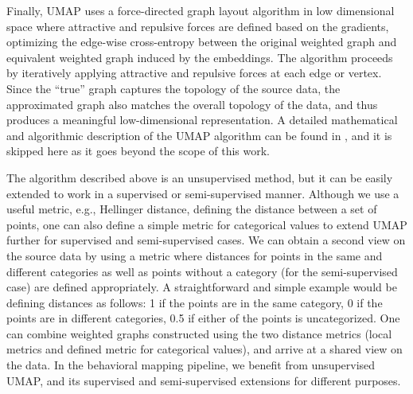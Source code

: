 Finally, UMAP uses a force-directed graph layout algorithm in low dimensional space where attractive and repulsive forces are defined based on the gradients, optimizing the edge-wise cross-entropy between the original weighted graph and equivalent weighted graph induced by the embeddings.
The algorithm proceeds by iteratively applying attractive and repulsive forces at each edge or vertex.
Since the ``true'' graph captures the topology of the source data, the approximated graph also matches the overall topology of the data, and thus produces a meaningful low-dimensional representation.
A detailed mathematical and algorithmic description of the UMAP algorithm can be found in \citep{mcinnes_umap_2020}, and it is skipped here as it goes beyond the scope of this work.

The algorithm described above is an unsupervised method, but it can be easily extended to work in a supervised or semi-supervised manner.
Although we use a useful metric, e.g., Hellinger distance, defining the distance between a set of points, one can also define a simple metric for categorical values to extend UMAP further for supervised and semi-supervised cases.
We can obtain a second view on the source data by using a metric where distances for points in the same  and different categories as well as points without a category (for the semi-supervised case) are defined appropriately.
A straightforward and simple example would be defining distances as follows: 1 if the points are in the same category, 0 if the points are in different categories, 0.5 if either of the points is uncategorized.
One can combine weighted graphs constructed using the two distance metrics (local metrics and defined metric for categorical values), and arrive at a shared view on the data.
In the behavioral mapping pipeline, we benefit from unsupervised UMAP, and its supervised and semi-supervised extensions for different purposes.

